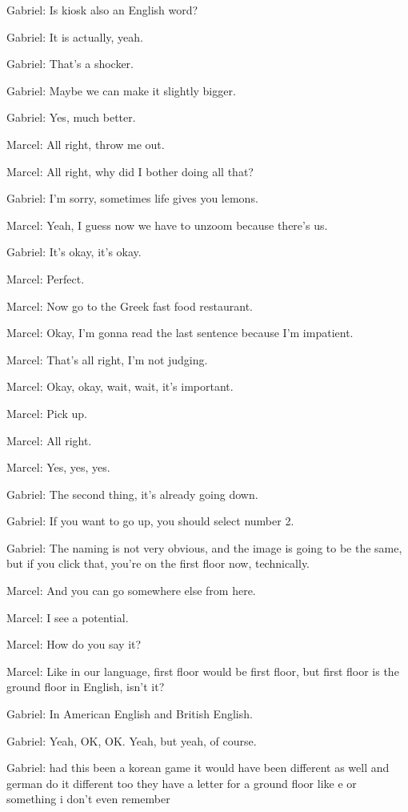 Gabriel: Is kiosk also an English word?

Gabriel: It is actually, yeah.

Gabriel: That's a shocker.

Gabriel: Maybe we can make it slightly bigger.

Gabriel: Yes, much better.

Marcel: All right, throw me out.

Marcel: All right, why did I bother doing all that?

Gabriel: I'm sorry, sometimes life gives you lemons.

Marcel: Yeah, I guess now we have to unzoom because there's us.

Gabriel: It's okay, it's okay.

Marcel: Perfect.

Marcel: Now go to the Greek fast food restaurant.

Marcel: Okay, I'm gonna read the last sentence because I'm impatient.

Marcel: That's all right, I'm not judging.

Marcel: Okay, okay, wait, wait, it's important.

Marcel: Pick up.

Marcel: All right.

Marcel: Yes, yes, yes.

Gabriel: The second thing, it's already going down.

Gabriel: If you want to go up, you should select number 2.

Gabriel: The naming is not very obvious, and the image is going to be the same, but if you click that, you're on the first floor now, technically.

Marcel: And you can go somewhere else from here.

Marcel: I see a potential.

Marcel: How do you say it?

Marcel: Like in our language, first floor would be first floor, but first floor is the ground floor in English, isn't it?

Gabriel: In American English and British English.

Gabriel: Yeah, OK, OK. Yeah, but yeah, of course.

Gabriel: had this been a korean game it would have been different as well and german do it different too they have a letter for a ground floor like e or something i don't even remember

